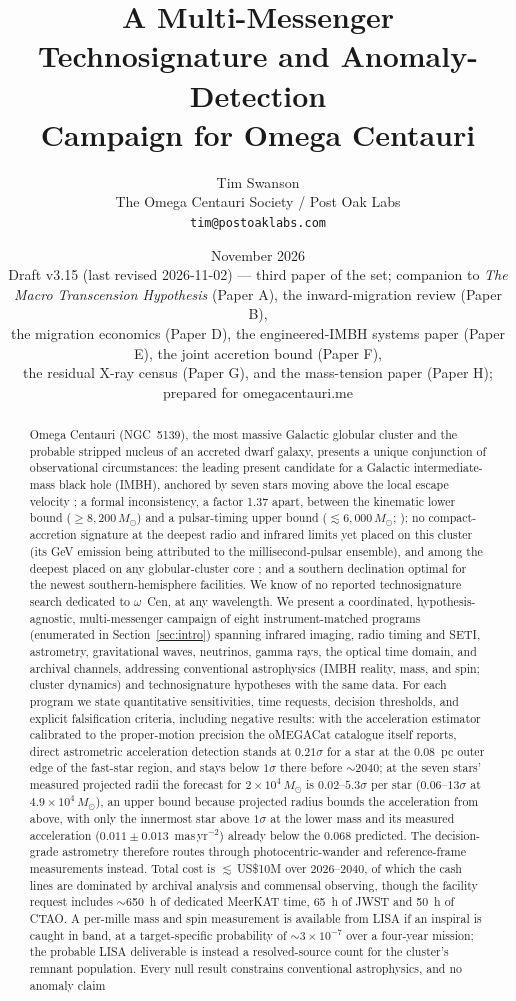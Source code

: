 \documentclass[11pt]{article}
\title{\textbf{A Multi-Messenger Technosignature and Anomaly-Detection\\ Campaign for Omega Centauri}}
\author{Tim Swanson\\[2pt]
\small The Omega Centauri Society / Post Oak Labs\\
\small \texttt{tim@postoaklabs.com}}
\date{November 2026 \\[4pt] \small Draft v3.15 (last revised 2026-11-02) --- third paper of the set; companion to \emph{The Macro Transcension Hypothesis} (Paper A), the inward-migration review (Paper B),\\ \small the migration economics (Paper D), the engineered-IMBH systems paper (Paper E), the joint accretion bound (Paper F),\\ \small the residual X-ray census (Paper G), and the mass-tension paper (Paper H);\\ \small prepared for omegacentauri.me}
\newcommand{\msun}{\ensuremath{M_\odot}}
\newcommand{\ocen}{\ensuremath{\omega}~Cen}
\begin{document}
\maketitle

\begin{abstract}
\noindent
Omega Centauri (NGC~5139), the most massive Galactic globular cluster and the probable stripped nucleus of an accreted dwarf galaxy, presents a unique conjunction of observational circumstances: the leading present candidate for a Galactic intermediate-mass black hole (IMBH), anchored by seven stars moving above the local escape velocity \citep{Haberle2024Nature}; a formal inconsistency, a factor 1.37 apart, between the kinematic lower bound ($\geq 8{,}200\,\msun$) and a pulsar-timing upper bound ($\lesssim 6{,}000\,\msun$; \citealt{BanaresHernandez2025}); no compact-accretion signature at the deepest radio and infrared limits yet placed on this cluster (its GeV emission being attributed to the millisecond-pulsar ensemble), and among the deepest placed on any globular-cluster core \citep{Mahida2026,Chen2025JWST}; and a southern declination optimal for the newest southern-hemisphere facilities. We know of no reported technosignature search dedicated to \ocen{}, at any wavelength. We present a coordinated, hypothesis-agnostic, multi-messenger campaign of eight instrument-matched programs (enumerated in Section~\ref{sec:intro}) spanning infrared imaging, radio timing and SETI, astrometry, gravitational waves, neutrinos, gamma rays, the optical time domain, and archival channels, addressing conventional astrophysics (IMBH reality, mass, and spin; cluster dynamics) and technosignature hypotheses with the same data. For each program we state quantitative sensitivities, time requests, decision thresholds, and explicit falsification criteria, including negative results: with the acceleration estimator calibrated to the proper-motion precision the oMEGACat catalogue itself reports, direct astrometric acceleration detection stands at $0.21\sigma$ for a star at the $0.08$~pc outer edge of the fast-star region, and stays below $1\sigma$ there before $\sim$2040; at the seven stars' measured projected radii the forecast for $2\times10^{4}\,\msun$ is $0.02$--$5.3\sigma$ per star ($0.06$--$13\sigma$ at $4.9\times10^{4}\,\msun$), an upper bound because projected radius bounds the acceleration from above, with only the innermost star above $1\sigma$ at the lower mass and its measured acceleration ($0.011 \pm 0.013$~mas\,yr$^{-2}$) already below the $0.068$ predicted. The decision-grade astrometry therefore routes through photocentric-wander and reference-frame measurements instead. Total cost is $\lesssim$\,US\$10M over 2026--2040, of which the cash lines are dominated by archival analysis and commensal observing, though the facility request includes $\sim$650~h of dedicated MeerKAT time, 65~h of JWST and 50~h of CTAO. A per-mille mass and spin measurement is available from LISA if an inspiral is caught in band, at a target-specific probability of $\sim3\times10^{-7}$ over a four-year mission; the probable LISA deliverable is instead a resolved-source count for the cluster's remnant population. Every null result constrains conventional astrophysics, and no anomaly claim 
\end{abstract}
\end{document}
